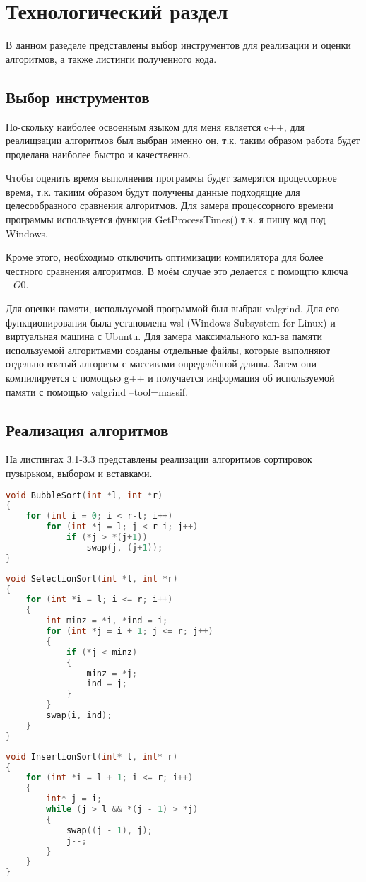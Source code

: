 \chapter{Технологический раздел}
В данном разеделе представлены выбор инструментов для реализации и оценки алгоритмов, а также листинги полученного кода.
\section{Выбор инструментов}
По-скольку наиболее освоенным языком для меня является c++, для реалищзации алгоритмов был выбран именно он, т.к. таким образом работа будет проделана наиболее быстро и качественно.

Чтобы оценить время выполнения программы будет замерятся процессорное время, т.к. такиим образом будут получены данные подходящие для целесообразного сравнения алгоритмов. Для замера процессорного времени программы используется функция GetProcessTimes() т.к. я пишу код под Windows. \cite{get_proccess_times}

Кроме этого, необходимо отключить оптимизации компилятора для более честного сравнения алгоритмов. В моём случае это делается с помощтю ключа $-O0$. \cite{optimization}

Для оценки памяти, используемой программой был выбран valgrind. Для его функционирования была установлена wsl (Windows Subsystem for Linux) и виртуальная машина с Ubuntu. Для замера максимального кол-ва памяти используемой алгоритмами созданы отдельные файлы, которые выполняют отдельно взятый алгоритм с массивами определённой длины. Затем они компилируется с помощью g++ и получается информация об используемой памяти с помощью valgrind --tool=massif. \cite{get_memory}

\section{Реализация алгоритмов}
На листингах 3.1-3.3 представлены реализации алгоритмов сортировок пузырьком, выбором и вставками.

\begin{lstlisting}[language=c++, caption=Реализация алгоритма сортировки пузырьком]
void BubbleSort(int *l, int *r)
{
	for (int i = 0; i < r-l; i++)
		for (int *j = l; j < r-i; j++)
			if (*j > *(j+1))
				swap(j, (j+1));
}
\end{lstlisting}

\begin{lstlisting}[language=c++, caption=Реализация алгоритма сортировки выбором]
void SelectionSort(int *l, int *r)
{
	for (int *i = l; i <= r; i++)
	{
		int minz = *i, *ind = i;
		for (int *j = i + 1; j <= r; j++)
		{
			if (*j < minz)
			{
				minz = *j;
				ind = j;
			}
		}
		swap(i, ind);
	}
}
\end{lstlisting}

\begin{lstlisting}[language=c++, caption=Реализация алгоритма сортировки вставками]
void InsertionSort(int* l, int* r)
{
	for (int *i = l + 1; i <= r; i++)
	{
		int* j = i;
		while (j > l && *(j - 1) > *j)
		{
			swap((j - 1), j);
			j--;
		}
	}
}
\end{lstlisting}